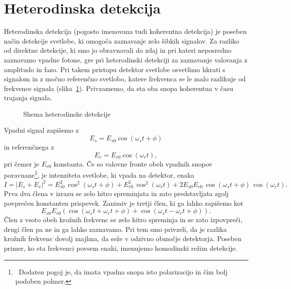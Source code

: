 \section{Heterodinska detekcija}
Heterodinska detekcija (pogosto imenovana tudi koherentna detekcija) je poseben način
detekcije svetlobe, ki omogoča zaznavanje zelo šibkih signalov. Za razliko od direktne detekcije,
ki smo jo obravnavali do zdaj in pri kateri neposredno zaznavamo vpadne fotone, 
gre pri heterodinski detekciji za zaznavanje valovanja z amplitudo in fazo. Pri takem 
pristopu detektor svetlobe osvetlimo hkrati s signalom in z močno referenčno svetlobo, 
katere frekvenca se le malo razlikuje od frekvence signala (slika~\ref{11_Hetero}). 
Privzamemo, da sta oba snopa 
koherentna v času trajanja signala.
\begin{figure}[ht]
\centering
\def\svgwidth{80truemm} 

\caption{Shema heterodinske detekcije}
\label{11_Hetero}
\end{figure}

Vpadni signal zapišemo z
\begin{equation}
E_s = E_{s0} \cos(\omega_st+\phi)
\end{equation}
in referenčnega z
\begin{equation}
E_r = E_{r0} \cos(\omega_rt),
\end{equation}
pri čemer je $E_{r0}$ konstanta. Če so valovne fronte obeh vpadnih snopov 
poravnane\footnote{~Dodaten pogoj je, da imata vpadna snopa isto polarizacijo in čim bolj 
podoben polmer.}, je intenziteta svetlobe, 
ki vpada na detektor, enaka
\begin{equation}
I = |E_s+E_r|^2 = E_{s0}^2 \, \cos^2(\omega_st+\phi)+
E_{r0}^2 \, \cos^2(\omega_rt) + 2E_{s0}E_{r0}\, \cos(\omega_st+\phi)\, \cos(\omega_rt).
\end{equation}
Prva dva člena v izrazu se zelo hitro spreminjata in zato predstavljata zgolj 
povprečen konstanten prispevek. 
Zanimiv je tretji člen, ki ga lahko zapišemo
kot
\begin{equation}
E_{s0}E_{r0}\left( \cos(\omega_st+\omega_rt+\phi)+\cos(\omega_st-\omega_rt+\phi)\right)\!.
\end{equation}
Člen z vsoto obeh krožnih frekvenc se zelo hitro spreminja in se zato izpovpreči, 
drugi člen pa ne in ga lahko zaznavamo. 
Pri tem smo privzeli, da je razlika krožnih frekvenc dovolj majhna, da seže v odzivno območje
detektorja. Poseben primer, ko sta frekvenci povsem enaki, imenujemo homodinski režim 
detekcije. 

